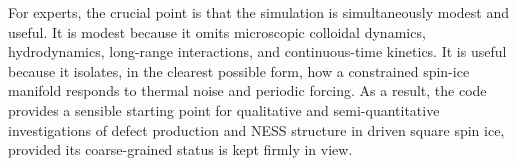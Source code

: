 \documentclass[11pt]{article}
\begin{document}
For experts, the crucial point is that the simulation is simultaneously modest
and useful. It is modest because it omits microscopic colloidal dynamics,
hydrodynamics, long-range interactions, and continuous-time kinetics. It is
useful because it isolates, in the clearest possible form, how a constrained
spin-ice manifold responds to thermal noise and periodic forcing. As a result,
the code provides a sensible starting point for qualitative and semi-quantitative
investigations of defect production and NESS structure in driven square spin
ice, provided its coarse-grained status is kept firmly in view.
\end{document}
